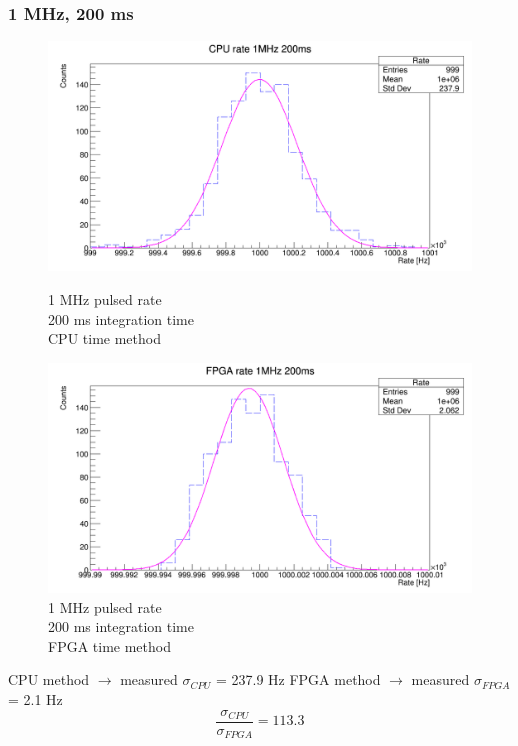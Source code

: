 \subsubsection{1 MHz, 200 ms}
\begin{figure}[H]
	\centering
	\begin{minipage}{0.49\textwidth}
		\centering
		\includegraphics[width=.99\linewidth]{IMG/ch5/RateMeasures/CPU-time-rate-1MHz-200ms}
		\caption{1 MHz pulsed rate\\200 ms integration time\\CPU time method}
		\label{fig:CPU-time-rate-1MHz-200ms}
	\end{minipage}%
	\begin{minipage}{0.49\textwidth}
		\centering
		\includegraphics[width=.99\linewidth]{IMG/ch5/RateMeasures/FPGA-time-rate-1MHz-200ms}
		\caption{1 MHz pulsed rate\\200 ms integration time\\FPGA time method}
		\label{fig:FPGA-time-rate-1MHz-200ms}
	\end{minipage}
\end{figure}
\noindent CPU method $\rightarrow$ measured $\sigma_{CPU}$ = 237.9 Hz
\newline
FPGA method $\rightarrow$ measured $\sigma_{FPGA}$ = 2.1 Hz
\begin{equation}
	\frac{\sigma_{CPU}}{\sigma_{FPGA}} = 113.3
\end{equation}

